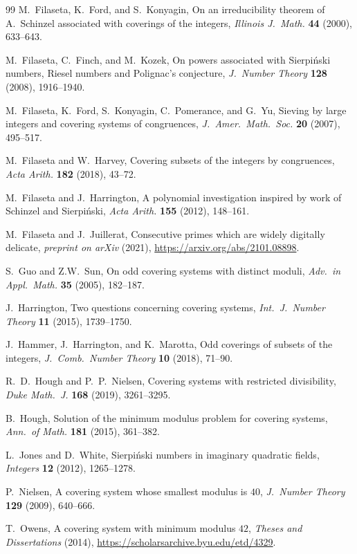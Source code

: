 \documentclass[10pt,a4paper]{amsart}
\begin{document}
\begin{thebibliography}{99}
M.~Filaseta, K.~Ford, and S.~Konyagin, On an irreducibility theorem of A.\ Schinzel associated with coverings of the integers, \textit{Illinois J.\ Math.\/} \textbf{44} (2000), 633--643.

M.~Filaseta, C.~Finch, and M.~Kozek, On powers associated with Sierpi\'{n}ski numbers, Riesel numbers and Polignac's conjecture, \textit{J.\ Number Theory} \textbf{128} (2008), 1916--1940.

M.~Filaseta, K.~Ford, S.~Konyagin, C.~Pomerance, and G.~Yu, Sieving by large integers and covering systems of congruences, \textit{J.\ Amer.\ Math.\ Soc.\/} \textbf{20} (2007), 495--517.

M.~Filaseta and W.~Harvey, Covering subsets of the integers by congruences, \textit{Acta Arith.\/} \textbf{182} (2018), 43--72.

M.~Filaseta and J.~Harrington, A polynomial investigation inspired by work of Schinzel and Sierpi\'{n}ski, \textit{Acta Arith.\/} \textbf{155} (2012), 148--161.

M.~Filaseta and J.~Juillerat, Consecutive primes which are widely digitally delicate, \textit{preprint on arXiv} (2021), \url{https://arxiv.org/abs/2101.08898}.

  S.~Guo and Z.W.~Sun, On odd covering systems with distinct moduli, \textit{Adv.\ in Appl.\ Math.\/} \textbf{35} (2005), 182--187.

J.~Harrington, Two questions concerning covering systems, \textit{Int.\ J.\ Number Theory} \textbf{11} (2015), 1739--1750.

J.~Hammer, J.~Harrington, and K.~Marotta, Odd coverings of subsets of the integers, \textit{J.\ Comb.\ Number Theory} \textbf{10} (2018), 71--90.

 R.~D.~Hough and P.~P.~Nielsen, Covering systems with restricted divisibility, \textit{Duke Math.\ J.\/} \textbf{168} (2019), 3261--3295.

B.~Hough, Solution of the minimum modulus problem for covering systems, \textit{Ann.\ of Math.\/} \textbf{181} (2015), 361--382.

L.~Jones and D.~White, Sierpi\'{n}ski numbers in imaginary quadratic fields, \textit{Integers} \textbf{12} (2012), 1265--1278.

P.~Nielsen, A covering system whose smallest modulus is $40$, \textit{J.\ Number Theory} \textbf{129} (2009), 640--666.

T.~Owens, A covering system with minimum modulus $42$, \textit{Theses and Dissertations} (2014), \url{https://scholarsarchive.byu.edu/etd/4329}.
\end{thebibliography}
\end{document}
